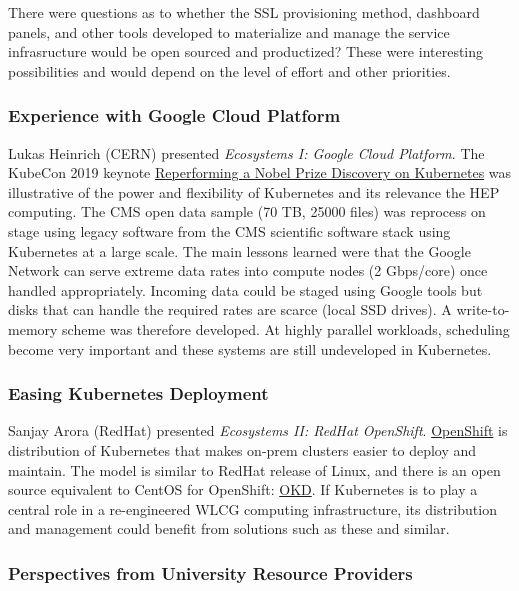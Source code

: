 \documentclass[11pt,letterpaper,fleqn]{article}
\begin{document}
There were questions as to whether the SSL provisioning method, dashboard panels, and other tools developed to materialize and manage the service infrasructure would be open sourced and productized?  These were interesting possibilities and would depend on the level of effort and other priorities.


\subsubsection{Experience with Google Cloud Platform}

Lukas Heinrich (CERN) presented {\it Ecosystems I: Google Cloud Platform}.  The KubeCon 2019 keynote \href{https://sched.co/MRyv}{Reperforming a Nobel Prize Discovery on Kubernetes} was illustrative of the power and flexibility of Kubernetes and its relevance the HEP computing.  The CMS open data sample (70 TB, 25000 files) was reprocess on stage using legacy software from the CMS scientific software stack using Kubernetes at a large scale.  The main lessons learned were that the Google Network can serve extreme data rates into compute nodes (2 Gbps/core) once handled appropriately. Incoming data could be staged using Google tools but disks that can handle the required rates are scarce (local SSD drives).  A write-to-memory scheme was therefore developed. At highly parallel workloads, scheduling become very important and these systems are still undeveloped in Kubernetes. 

\subsubsection{Easing Kubernetes Deployment}

Sanjay Arora (RedHat) presented {\it Ecosystems II: RedHat OpenShift}.  \href{https://www.openshift.com/}{OpenShift} is distribution of Kubernetes that makes on-prem clusters easier to deploy and maintain.  The model is similar to RedHat release of Linux, and there is an open source equivalent to CentOS for OpenShift: \href{https://www.okd.io/}{OKD}.  If Kubernetes is to play a central role in a re-engineered WLCG computing infrastructure, its distribution and management could benefit from solutions such as these and similar.  


\subsubsection{Perspectives from University Resource Providers}
\end{document}

